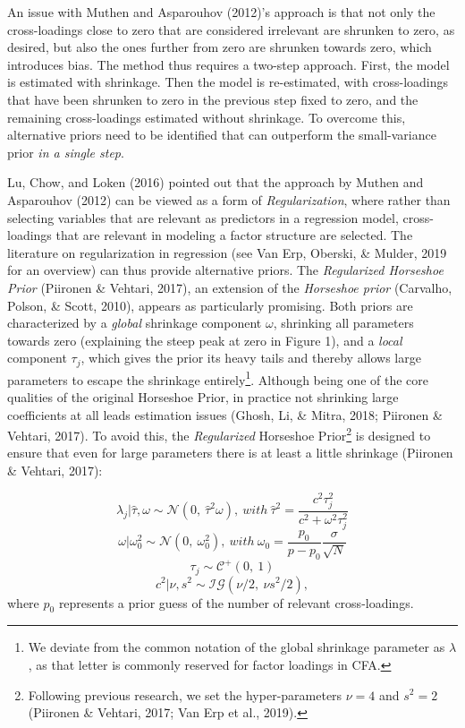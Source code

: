 \documentclass[
  english,
  man]{apa6}
\begin{document}
An issue with Muthen and Asparouhov (2012)'s approach is that not only the cross-loadings
close to zero that are considered irrelevant are shrunken to zero, as
desired, but also the ones further from zero are shrunken
towards zero, which introduces bias. The method thus requires a two-step
approach. First, the model is estimated with shrinkage. Then the model
is re-estimated, with cross-loadings that have been shrunken to zero in
the previous step fixed to zero, and the remaining cross-loadings
estimated without shrinkage. To overcome this, alternative priors need
to be identified that can outperform the small-variance prior \emph{in a
single step}.

Lu, Chow, and Loken (2016) pointed out that the approach by
Muthen and Asparouhov (2012) can be viewed as a form of \emph{Regularization}, where
rather than selecting variables that are relevant as predictors in a
regression model, cross-loadings that are relevant in modeling a factor
structure are selected. The literature on regularization in regression
(see Van Erp, Oberski, \& Mulder, 2019 for an overview) can thus provide
alternative priors. The \emph{Regularized Horseshoe Prior}
(Piironen \& Vehtari, 2017), an extension of the \emph{Horseshoe prior}
(Carvalho, Polson, \& Scott, 2010), appears as particularly promising. Both
priors are characterized by a \emph{global} shrinkage component \(\omega\),
shrinking all parameters towards zero (explaining the steep peak at zero
in Figure 1), and a \emph{local} component \(\tau_j\), which
gives the prior its heavy tails and thereby allows large parameters to
escape the shrinkage entirely\footnote{We deviate from the common notation of the global shrinkage
  parameter as \(\lambda\), as that letter is commonly reserved for
  factor loadings in CFA.}. Although being one of the core
qualities of the original Horseshoe Prior, in practice not shrinking
large coefficients at all leads estimation issues (Ghosh, Li, \& Mitra, 2018; Piironen \& Vehtari, 2017). To
avoid this, the \emph{Regularized} Horseshoe Prior\footnote{Following previous research, we set the hyper-parameters \(\nu = 4\)
  and \(s^2 = 2\) (Piironen \& Vehtari, 2017; Van Erp et al., 2019).} is designed to ensure
that even for large parameters there is at least a little shrinkage
(Piironen \& Vehtari, 2017):

\[\lambda_j | \hat{\tau}, \omega \sim \mathcal{N}(0, \ \hat{\tau}^2 \omega), \ with \ \hat{\tau}^2 = \frac{c^2\tau_j^2}{c^2 + \omega^2 \tau_j^2}\]
\[\omega | \omega_0^2 \sim \mathcal{N}(0,\  \omega_0^2), \ with \  \omega_0 = \frac{p_0}{p-p_0}\frac{\sigma}{\sqrt{N}}\]
\[\tau_j \sim \mathcal{C^+}(0, \ 1)\]
\[c^2 | \nu, s^2 \sim \mathcal{IG}(\nu/2, \  \nu s^2/2),\] where \(p_0\)
represents a prior guess of the number of relevant cross-loadings.
\end{document}
